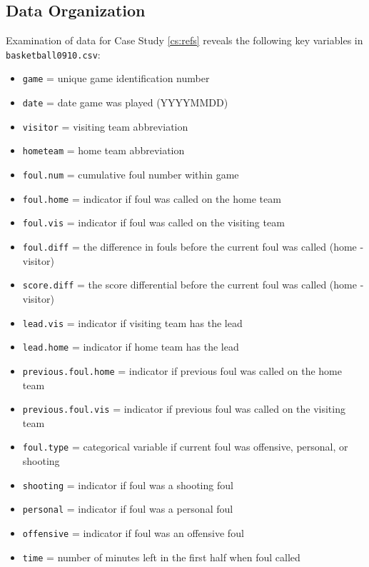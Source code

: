 \documentclass[
]{krantz}
\providecommand{\tightlist}{%
  \setlength{\itemsep}{0pt}\setlength{\parskip}{0pt}}
\begin{document}
\hypertarget{data-organization-5}{%
\subsection{Data Organization}\label{data-organization-5}}

Examination of data for Case Study \ref{cs:refs} reveals the following key variables in \texttt{basketball0910.csv}:

\begin{itemize}
\tightlist
\item
  \texttt{game} = unique game identification number
\item
  \texttt{date} = date game was played (YYYYMMDD)
\item
  \texttt{visitor} = visiting team abbreviation
\item
  \texttt{hometeam} = home team abbreviation
\item
  \texttt{foul.num} = cumulative foul number within game
\item
  \texttt{foul.home} = indicator if foul was called on the home team
\item
  \texttt{foul.vis} = indicator if foul was called on the visiting team
\item
  \texttt{foul.diff} = the difference in fouls before the current foul was called (home - visitor)
\item
  \texttt{score.diff} = the score differential before the current foul was called (home - visitor)
\item
  \texttt{lead.vis} = indicator if visiting team has the lead
\item
  \texttt{lead.home} = indicator if home team has the lead
\item
  \texttt{previous.foul.home} = indicator if previous foul was called on the home team
\item
  \texttt{previous.foul.vis} = indicator if previous foul was called on the visiting team
\item
  \texttt{foul.type} = categorical variable if current foul was offensive, personal, or shooting
\item
  \texttt{shooting} = indicator if foul was a shooting foul
\item
  \texttt{personal} = indicator if foul was a personal foul
\item
  \texttt{offensive} = indicator if foul was an offensive foul
\item
  \texttt{time} = number of minutes left in the first half when foul called
\end{itemize}
\end{document}
